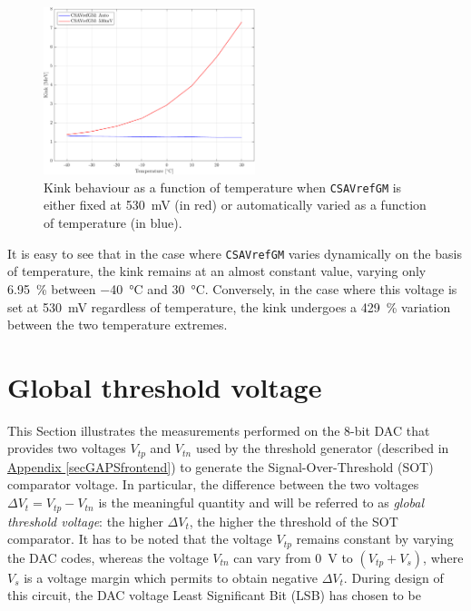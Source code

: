 \begin{figure}[h!]
    \centering
    \includegraphics[width=0.55\textwidth]{Images/chap1/results/FDT/plot_pedestal_gain_auto_530mV.pdf}
    \caption{Kink behaviour as a function of temperature when \texttt{CSAVrefGM} is either fixed at \SI{530}{\milli\volt} (in red) or automatically varied as a function of temperature (in blue).}
    \label{figFDTkinkVariationResult}
\end{figure}

\par
It is easy to see that in the case where \texttt{CSAVrefGM} varies dynamically on the basis of temperature, the kink remains at an almost constant value, varying only \SI{6.95}{\percent} between \SI{-40}{\celsius} and \SI{30}{\celsius}. Conversely, in the case where this voltage is set at \SI{530}{\milli\volt} regardless of temperature, the kink undergoes a \SI{429}{\percent} variation between the two temperature extremes.



\section{Global threshold voltage}
\label{thresholdVoltageANALYSIS}

This Section illustrates the measurements performed on the 8-bit DAC that provides two voltages $V_{\textit{tp}}$ and $V_{\textit{tn}}$ used by the threshold generator (described in \hyperref[secGAPSfrontend]{Appendix \ref{secGAPSfrontend}}) to generate the Signal-Over-Threshold (SOT) comparator voltage. In particular, the difference between the two voltages $\Delta V_{\textit{t}} = V_{\textit{tp}}-V_{\textit{tn}}$ is the meaningful quantity and will be referred to as \textit{global threshold voltage}: the higher $\Delta V_{\textit{t}}$, the higher the threshold of the SOT comparator. It has to be noted that the voltage $V_{\textit{tp}}$ remains constant by varying the DAC codes, whereas the voltage $V_{\textit{tn}}$ can vary from \SI{0}{\volt} to $(V_{\textit{tp}}+V_{\textit{s}})$, where $V_{\textit{s}}$ is a voltage margin which permits to obtain negative $\Delta V_{\textit{t}}$. During design of this circuit, the DAC voltage Least Significant Bit (LSB) has chosen to be

